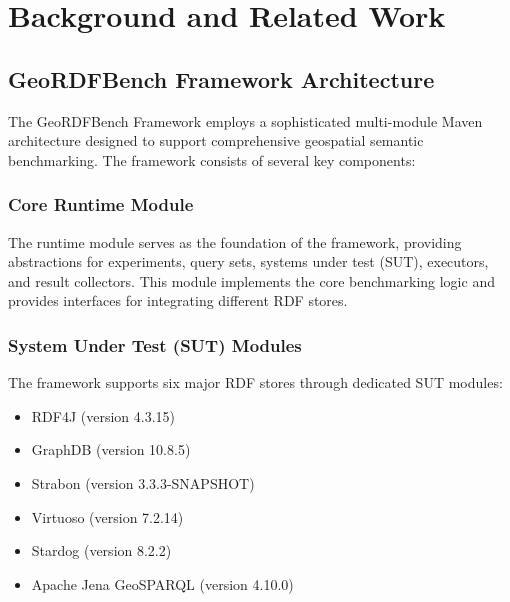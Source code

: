 \documentclass[11pt,a4paper]{article}
\begin{document}
\section{Background and Related Work}

\subsection{GeoRDFBench Framework Architecture}

The GeoRDFBench Framework employs a sophisticated multi-module Maven architecture designed to support comprehensive geospatial semantic benchmarking. The framework consists of several key components:

\subsubsection{Core Runtime Module}
The runtime module serves as the foundation of the framework, providing abstractions for experiments, query sets, systems under test (SUT), executors, and result collectors. This module implements the core benchmarking logic and provides interfaces for integrating different RDF stores.

\subsubsection{System Under Test (SUT) Modules}
The framework supports six major RDF stores through dedicated SUT modules:
\begin{itemize}
    \item RDF4J (version 4.3.15)
    \item GraphDB (version 10.8.5)
    \item Strabon (version 3.3.3-SNAPSHOT)
    \item Virtuoso (version 7.2.14)
    \item Stardog (version 8.2.2)
    \item Apache Jena GeoSPARQL (version 4.10.0)
\end{itemize}
\end{document}
